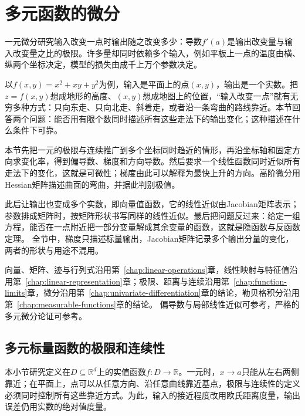 \par{}
\section{多元函数的微分}
\label{sec:analysis-multivariable-differentiation}
\label{sec:multivariable-differentiation}

一元微分研究输入改变一点时输出随之改变多少：导数$f'(a)$是输出改变量与输入改变量之比的极限。许多量却同时依赖多个输入，例如平板上一点的温度由横、纵两个坐标决定，模型的损失由成千上万个参数决定。

以$f(x,y)=x^2+xy+y^2$为例，输入是平面上的点$(x,y)$，输出是一个实数。把$z=f(x,y)$想成地形的高度、$(x,y)$想成地图上的位置，“输入改变一点”就有无穷多种方式：只向东走、只向北走、斜着走，或者沿一条弯曲的路线靠近。本节回答两个问题：能否用有限个数同时描述所有这些走法下的输出变化；这种描述在什么条件下可靠。

本节先把一元的极限与连续推广到多个坐标同时趋近的情形，再沿坐标轴和固定方向求变化率，得到偏导数、梯度和方向导数。然后要求一个线性函数同时近似所有走法下的变化，这就是可微性；梯度由此可以解释为最快上升的方向。高阶微分用Hessian矩阵描述曲面的弯曲，并据此判别极值。

此后让输出也变成多个实数，即向量值函数，它的线性近似由Jacobian矩阵表示；参数排成矩阵时，按矩阵形状书写同样的线性近似。最后把问题反过来：给定一组方程，能否在一点附近把一部分变量解成其余变量的函数，这就是隐函数与反函数定理。
全节中，梯度只描述标量输出，Jacobian矩阵记录多个输出分量的变化，两者的形状与用途不混用。

向量、矩阵、迹与行列式沿用第~\ref{chap:linear-operations}章，线性映射与特征值沿用第~\ref{chap:linear-representation}章；极限、距离与连续沿用第~\ref{chap:function-limits}章，微分沿用第~\ref{chap:univariate-differentiation}章的结论，勒贝格积分沿用第~\ref{chap:measurable-functions}章的结论。
偏导数与局部线性近似可参考，严格的多元微分论证可参考。

\subsection{多元标量函数的极限和连续性}
\label{sec:multivariable-limits-continuity}

本小节研究定义在$D\subseteq\mathbb R^d$上的实值函数$f:D\to\mathbb R$。一元时，$x\to a$只能从左右两侧靠近；在平面上，点可以从任意方向、沿任意曲线靠近基点，极限与连续性的定义必须同时控制所有这些靠近方式。为此，输入的接近程度改用欧氏距离度量，输出误差仍用实数的绝对值度量。


